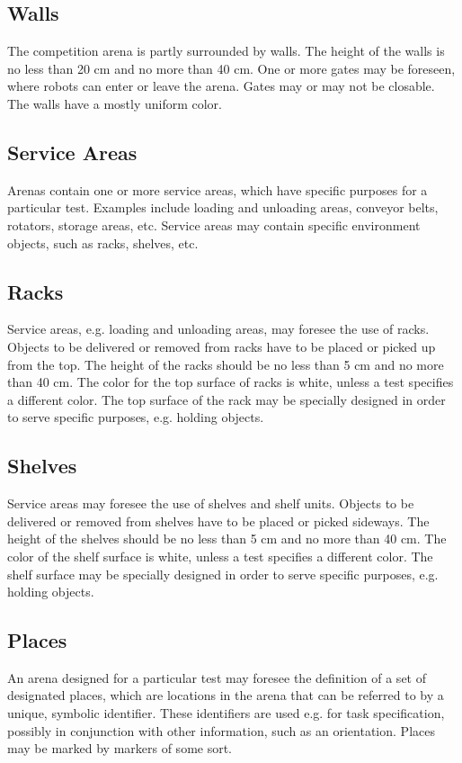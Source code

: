 \subsection{Walls}
The competition arena is partly surrounded by walls. The height of the walls is no less than 20 cm and no more than 40 cm. One or more gates may be foreseen, where robots can enter or leave the arena. Gates may or may not be closable. The walls have a mostly uniform color.

\subsection{Service Areas}
Arenas contain one or more service areas, which have specific purposes for a particular test. Examples include loading and unloading areas, conveyor belts, rotators, storage areas, etc. Service areas may contain specific environment objects, such as racks, shelves, etc. 

\subsection{Racks}
Service areas, e.g. loading and unloading areas, may foresee the use of racks. Objects to be delivered or removed from racks have to be placed or picked up from the top. The height of the racks should be no less than 5 cm and no more than 40 cm. The color for the top surface of racks is white, unless a test specifies a different color. The top surface of the rack may be specially designed in order to serve specific purposes, e.g. holding objects. 

\subsection{Shelves}
Service areas may foresee the use of shelves and shelf units. Objects to be delivered or removed from shelves have to be placed or picked sideways. The height of the shelves should be no less than 5 cm and no more than 40 cm. The color of the shelf surface is white, unless a test specifies a different color. The shelf surface may be specially designed in order to serve specific purposes, e.g. holding objects. 

\subsection{Places}
An arena designed for a particular test may foresee the definition of a set of designated places, which are locations in the arena that can be referred to by a unique, symbolic identifier. These identifiers are used e.g. for task specification, possibly in conjunction with other information, such as an orientation. Places may be marked by markers of some sort. 

